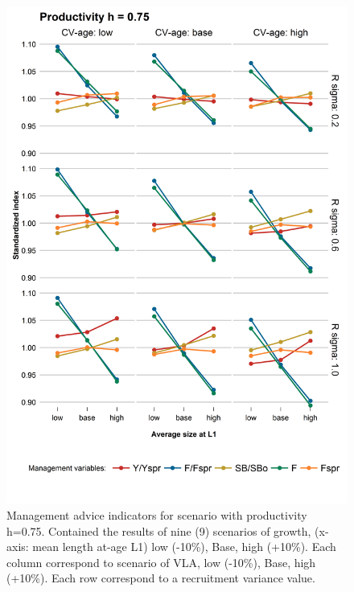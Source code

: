 \begin{figure}[hbtp]
	\begin{center}
\includegraphics[width=0.70\columnwidth]{figures/steepness-75-var.png}
  \end{center}
\caption{Management advice indicators for scenario with productivity h=0.75. Contained the results of nine (9) scenarios of growth, (x-axis: mean length at-age L1) low (-10\%), Base, high (+10\%). Each column correspond to scenario of VLA, low (-10\%), Base, high (+10\%). Each row correspond to a recruitment variance value.}
\label{figure1}
\end{figure}


